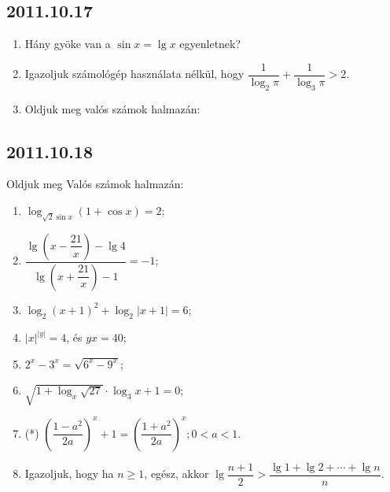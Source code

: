 \subsection*{2011.10.17}

\begin{enumerate}
		\item Hány gyöke van a $\sin x=\lg x$ egyenletnek?
		\item Igazoljuk számológép használata nélkül, hogy $\dfrac{1}{\log_{2} \pi}+\dfrac{1}{\log_{3} \pi}>2$.
		\item Oldjuk meg valós számok halmazán:
\end{enumerate}


\subsection*{2011.10.18}
Oldjuk meg Valós számok halmazán:
\begin{enumerate}
        \item $\log_{\sqrt{2}\sin x}(1+\cos x) = 2$;
        \item $\dfrac{\lg \left(x-\dfrac{21}{x}\right)-\lg 4}{\lg \left(x+\dfrac{21}{x}\right)-1} = -1$;
		\item $\log_{2}(x+1)^{2}+\log_{2}|x+1| =6$;
        \item $|x|^{|y|}=4$, és $yx = 40$;
        \item $2^{x}-3^{x} = \sqrt{6^{x}-9^{x}}$;
        \item $\sqrt{1+\log_{x}\sqrt{27}}\cdot\log_{3}x+1 =0$;
        \item (*) $\left(\dfrac{1-a^{2}}{2a}\right)^{x}+1 =\left(\dfrac{1+a^{2}}{2a}\right)^{x}; 0<a<1$.
        \item Igazoljuk, hogy ha $n\ge1$, egész, akkor $\lg\dfrac{n+1}{2}>\dfrac{\lg1+\lg2+\cdots+\lg n}{n}$.
\end{enumerate}



